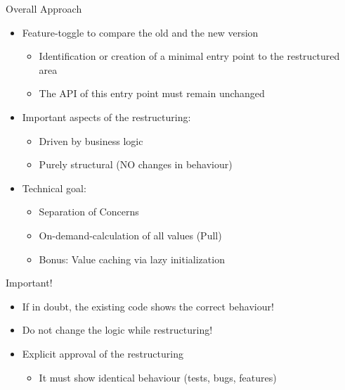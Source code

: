 \begin{frame}[fragile]{Overall Approach}
\begin{itemize}
\item Feature-toggle to compare the old and the new version
\begin{itemize}
\item Identification or creation of a minimal entry point to the restructured area
\item The API of this entry point must remain unchanged
\end{itemize}
\end{itemize}

\begin{itemize}
\item Important aspects of the restructuring:
\begin{itemize}
\item Driven by business logic
\item Purely structural (NO changes in behaviour)
\end{itemize}
\end{itemize}

\begin{itemize}
\item Technical goal:
\begin{itemize}
\item Separation of Concerns
\item On-demand-calculation of all values (\glqq Pull\grqq{})
\item Bonus: Value caching via lazy initialization
\end{itemize}

\end{itemize}
\end{frame}

\begin{frame}[fragile]{Important!}
\begin{itemize}
\item If in doubt, the existing code shows the correct behaviour!

\item Do not change the logic while restructuring!

\item Explicit approval of the restructuring
\begin{itemize}
\item It must show identical behaviour (tests, bugs, features)
\end{itemize}

\end{itemize}
\end{frame}

